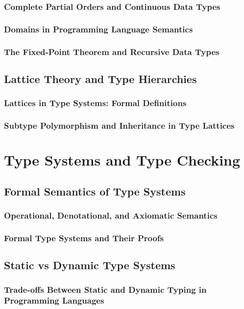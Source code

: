 \documentclass[12pt, oneside]{book}
\begin{document}
\subsubsection{Complete Partial Orders and Continuous Data Types}
\subsubsection{Domains in Programming Language Semantics}
\subsubsection{The Fixed-Point Theorem and Recursive Data Types}
\subsection{Lattice Theory and Type Hierarchies}
\subsubsection{Lattices in Type Systems: Formal Definitions}
\subsubsection{Subtype Polymorphism and Inheritance in Type Lattices}

\section{Type Systems and Type Checking}
\subsection{Formal Semantics of Type Systems}
\subsubsection{Operational, Denotational, and Axiomatic Semantics}
\subsubsection{Formal Type Systems and Their Proofs}
\subsection{Static vs Dynamic Type Systems}
\subsubsection{Trade-offs Between Static and Dynamic Typing in Programming Languages}
\end{document}
